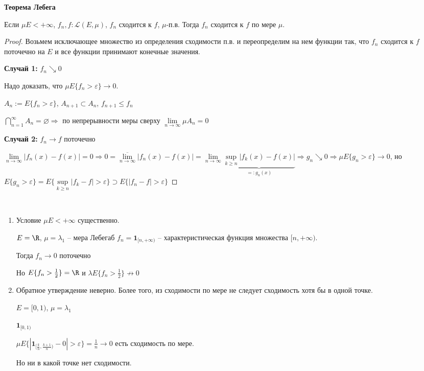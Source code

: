 \begin{theorem}
    \textbf{Теорема Лебега}

    Если $\mu E<+\infty$, $f_n, f:\mathcal{L}(E, \mu)$, $f_n$ сходится к $f$,
    $\mu$-п.в. Тогда $f_n$ сходится к $f$ по мере $\mu$.
\end{theorem}

\begin{proof}
    Возьмем исключающее множество из определения сходимости п.в. и переопределим на 
    нем функции так, что $f_n$ сходится к $f$ поточечно на $E$ и все функции принимают конечные значения.

    \textbf{Случай 1:} $f_n \searrow 0$

    Надо доказать, что $\mu E\{f_n > \varepsilon\}\rightarrow 0$.

    $A_n:=E\{f_n > \varepsilon\}$, $A_{n+1}\subset A_n$, $f_{n+1}\leq f_n$

    $\bigcap\limits_{n=1}^\infty A_n=\varnothing\Rightarrow$ по непрерывности меры 
    сверху $\lim\limits_{n\rightarrow \infty} \mu A_n = 0$

    \textbf{Случай 2:} $f_n \rightarrow f$ поточечно

    $\lim\limits_{n\rightarrow \infty} |f_n(x)-f(x)|=0\Rightarrow 0=
    \overline{\lim\limits_{n\rightarrow \infty}} |f_n(x)-f(x)|=\lim\limits_{n\rightarrow \infty} \underbrace{\underset{k\geq n}{\sup} |f_k(x)-f(x)|}_{=: g_n(x)}
    \Rightarrow g_n \searrow 0\Rightarrow \mu E \{g_n > \varepsilon\}\rightarrow 0$, но 
    $E \{g_n > \varepsilon\}=E\{\underset{k\geq n}{\sup} |f_k - f|> \varepsilon\}\supset 
    E\{|f_n - f|> \varepsilon\}$
\end{proof}

\begin{remark}~
    \begin{enumerate}
        \item Условие $\mu E < +\infty $ существенно.
        
        $E=\R$, $\mu =\lambda_1$ – мера Лебегаб $f_n = \mathbf{1}_{[n, +\infty)}$ – 
        характеристическая функция множества $[n, +\infty)$.

        Тогда $f_n\rightarrow 0$ поточечно

        Но $E\{f_n > \frac{1}{2}\}=\R$ и $\lambda E\{f_n > \frac{1}{2}\} \not\rightarrow 0$

        \item Обратное утверждение неверно. Более того, из сходимости по мере не
        следует сходимость хотя бы в одной точке.

        $E=[0, 1)$, $\mu =\lambda_1$

        $\mathbf{1}_{[0, 1)}$


        $\mu E \{|\mathbf{1}_{[\frac{k}{n}, \frac{k+1}{n})} - 0|> \varepsilon\} 
        =\frac{1}{n}\rightarrow 0$ есть сходимость по мере.

        Но ни в какой точке нет сходимости.
    \end{enumerate}
\end{remark}


